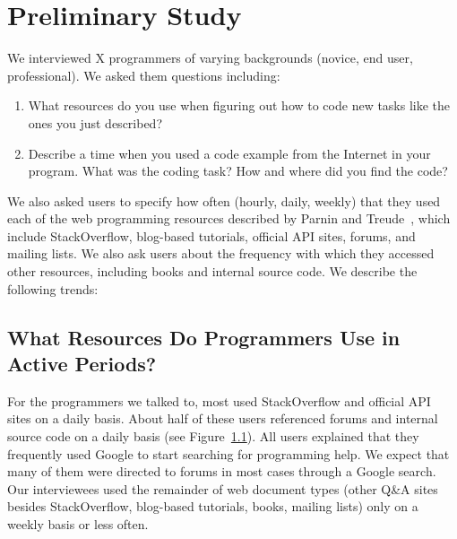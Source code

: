\section{Preliminary Study}


We interviewed X programmers of varying backgrounds (novice, end user, professional).
We asked them questions including:
\begin{enumerate}
\item What resources do you use when figuring out how to code new tasks like the ones you just described?
\item Describe a time when you used a code example from the Internet in your program.  What was the coding task?  How and where did you find the code?
\end{enumerate}
We also asked users to specify how often (hourly, daily, weekly) that they used each of the web programming resources described by Parnin and Treude~\cite{Parnin-Measuring}, which include StackOverflow, blog-based tutorials, official API sites, forums, and mailing lists.
We also ask users about the frequency with which they accessed other resources, including books and internal source code.
We describe the following trends:

\subsection{What Resources Do Programmers Use in Active Periods?}
For the programmers we talked to, most used StackOverflow and official API sites on a daily basis.
About half of these users referenced forums and internal source code on a daily basis (see Figure~\ref{}).
All users explained that they frequently used Google to start searching for programming help.
We expect that many of them were directed to forums in most cases through a Google search.
Our interviewees used the remainder of web document types (other Q\&A sites besides StackOverflow, blog-based tutorials, books, mailing lists) only on a weekly basis or less often.

